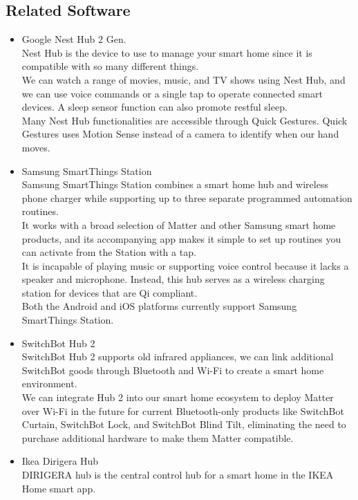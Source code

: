 \documentclass[conference]{IEEEtran}
\begin{document}
\subsection{\large{Related Software}}
\begin{itemize}
\item Google Nest Hub 2 Gen.\\
Nest Hub is the device to use to manage your smart home since it is compatible with so many different things.\\
We can watch a range of movies, music, and TV shows using Nest Hub, and we can use voice commands or a single tap to operate connected smart devices. A sleep sensor function can also promote restful sleep.\\
Many Nest Hub functionalities are accessible through Quick Gestures. Quick Gestures uses Motion Sense instead of a camera to identify when our hand moves.\\
\item Samsung SmartThings Station\\
Samsung SmartThings Station combines a smart home hub and wireless phone charger while supporting up to three separate programmed automation routines.\\
It works with a broad selection of Matter and other Samsung smart home products, and its accompanying app makes it simple to set up routines you can activate from the Station with a tap.\\
It is incapable of playing music or supporting voice control because it lacks a speaker and microphone. Instead, this hub serves as a wireless charging station for devices that are Qi compliant.\\
Both the Android and iOS platforms currently support Samsung SmartThings Station.\\
\item SwitchBot Hub 2\\
SwitchBot Hub 2 supports old infrared appliances, we can link additional SwitchBot goods through Bluetooth and Wi-Fi to create a smart home environment.\\
We can integrate Hub 2 into our smart home ecosystem to deploy Matter over Wi-Fi in the future for current Bluetooth-only products like SwitchBot Curtain, SwitchBot Lock, and SwitchBot Blind Tilt, eliminating the need to purchase additional hardware to make them Matter compatible.\\
\item Ikea Dirigera Hub\\
DIRIGERA hub is the central control hub for a smart home in the IKEA Home smart app.\\

\end{itemize}
\end{document}
